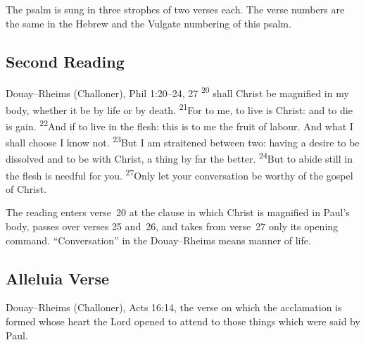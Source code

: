 \noindent The psalm is sung in three strophes of two verses each. The verse
numbers are the same in the Hebrew and the Vulgate numbering of this psalm.

\subsection{Second Reading}
\label{proper-second-reading}


\begin{englishwitness}{Douay--Rheims (Challoner), Phil 1:20--24, 27}
\textsuperscript{20} shall Christ be magnified in my body, whether it be by life or by
death. \textsuperscript{21}For to me, to live is Christ: and to die is gain.
\textsuperscript{22}And if to live in the flesh: this is to me the fruit of
labour. And what I shall choose I know not. \textsuperscript{23}But I am
straitened between two: having a desire to be dissolved and to be with Christ,
a thing by far the better. \textsuperscript{24}But to abide still in the flesh
is needful for you. \textsuperscript{27}Only let your conversation be worthy
of the gospel of Christ.
\end{englishwitness}

\noindent The reading enters verse~20 at the clause in which Christ is
magnified in Paul's body, passes over verses 25 and~26, and takes from
verse~27 only its opening command. ``Conversation'' in the Douay--Rheims means
manner of life.

\subsection{Alleluia Verse}
\label{proper-gospel-acclamation}


\begin{englishwitness}{Douay--Rheims (Challoner), Acts 16:14, the verse on which the acclamation is formed}
 whose heart the Lord opened to
attend to those things which were said by Paul.
\end{englishwitness}

